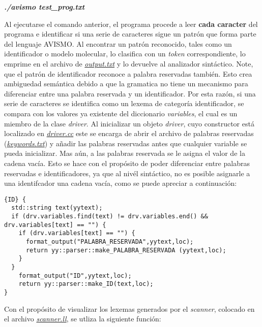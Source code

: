 \begin{center}
\textbf{\textit{./avismo test\_prog.txt}}
\end{center}

Al ejecutarse el comando anterior, el programa procede a leer \textbf{cada caracter} del programa e identificar si una serie de caracteres sigue un patrón que forma parte del lenguaje AVISMO. Al encontrar un patrón reconocido, tales como un identificador o modelo molecular, lo clasifica con un \textit{token} correspondiente, lo emprime en el archivo de \href{https://github.com/aramis-matos/comp4999_compilers_project/blob/master/code/output.txt}\textit{output.txt} y lo devuelve al analizador sintáctico. Note, que el patrón de identificador reconoce a palabra reservadas también. Esto crea ambiguedad semántica debido a que la gramatica no tiene un mecanismo para diferenciar entre una palabra reservada y un identificador. Por esta razón, si una serie de caracteres se identifica como un lexema de categoría identificador, se compara con los valores ya existente del diccionario \textit{variables}, el cual es un miembro de la clase \textit{driver}. Al inicializar un objeto \textit{driver}, cuyo constructor está localizado en \href{https://github.com/aramis-matos/comp4999_compilers_project/blob/master/code/driver.cc}{\textit{driver.cc}} este se encarga de abrir el archivo de
palabras reservadas (\href{https://github.com/aramis-matos/comp4999_compilers_project/blob/master/code/keywords.txt}{\textit{keywords.txt}}) y añadir las palabras reservadas antes que cualquier variable se pueda inicializar. Mas aún, a las palabras reservada se le asigna el valor de la cadena vacía. Esto se hace con el propósito de poder diferenciar entre palabras reservadas e identificadores, ya que al nivél sintáctico, no es posible asignarle a una identifcador una cadena vacía, como se puede apreciar a continuación:
\begin{lstlisting}
{ID} {	
  std::string text(yytext);
  if (drv.variables.find(text) != drv.variables.end() && drv.variables[text] == "") {
    if (drv.variables[text] == "") {
      format_output("PALABRA_RESERVADA",yytext,loc);
      return yy::parser::make_PALABRA_RESERVADA (yytext,loc);
    }
  }
	format_output("ID",yytext,loc);
	return yy::parser::make_ID(text,loc);
}
\end{lstlisting}
Con el propósito de visualizar los lexemas generados por el \textit{scanner}, colocado en el archivo \href{https://github.com/aramis-matos/comp4999_compilers_project/blob/master/code/scanner.ll}{\textit{scanner.ll}}, se utliza la siguiente función:

